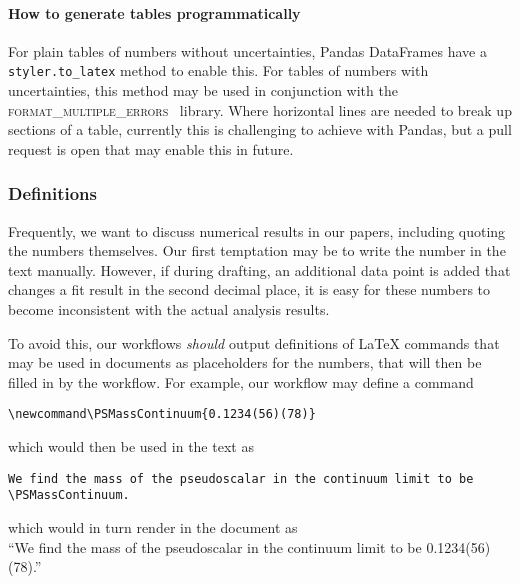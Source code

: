 \documentclass{article}
\newcommand\rfcword[1]{\emph{#1}\xspace}
\newcommand\should{\rfcword{should}}
\newcommand\program[1]{\textsc{#1}\xspace}
\begin{document}
\paragraph{How to generate tables programmatically}

For plain tables of numbers without uncertainties,
Pandas DataFrames have a \verb|styler.to_latex| method to enable this.
For tables of numbers with uncertainties,
this method may be used in conjunction with
the \program{format\_multiple\_errors}~\cite{fme} library.
Where horizontal lines are needed to break up sections of a table,
currently this is challenging to achieve with Pandas,
but a pull request is open that may enable this in future.

\subsubsection{Definitions}

Frequently,
we want to discuss numerical results in our papers,
including quoting the numbers themselves.
Our first temptation may be to write the number in the text manually.
However,
if during drafting,
an additional data point is added that changes a fit result in the second decimal place,
it is easy for these numbers to become inconsistent with the actual analysis results.

To avoid this,
our workflows \should output definitions of LaTeX commands
that may be used in documents as placeholders for the numbers,
that will then be filled in by the workflow.
For example,
our workflow may define a command
\begin{verbatim}
\newcommand\PSMassContinuum{0.1234(56)(78)}
\end{verbatim}
which would then be used in the text as
\begin{verbatim}
We find the mass of the pseudoscalar in the continuum limit to be \PSMassContinuum.
\end{verbatim}
which would in turn render in the document as\\
``We find the mass of the pseudoscalar in the continuum limit to be 0.1234(56)(78).''
\end{document}
